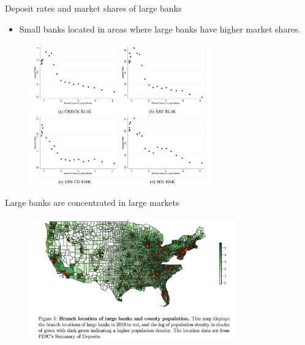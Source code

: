 \documentclass[notes,10pt, aspectratio=169]{beamer}
\newenvironment{wideitemize}{\itemize\addtolength{\itemsep}{10pt}}{\enditemize}
\begin{document}
\begin{frame}{Deposit rates and market shares of large banks}

        \begin{itemize}
            \item Small banks located in areas where large banks have higher market shares.
        \end{itemize}
    
        \begin{figure}
            \centering
            \includegraphics[width=0.7\textwidth]{imgs/fig2.png}
        \end{figure}
        
\end{frame}

\begin{frame}{Large banks are concentrated in large markets}

    
    
    \begin{figure}
    \centering
    \includegraphics[width=0.8\textwidth]{imgs/fig3_foot.png}
    \end{figure}
    
    \end{frame}
\end{document}
